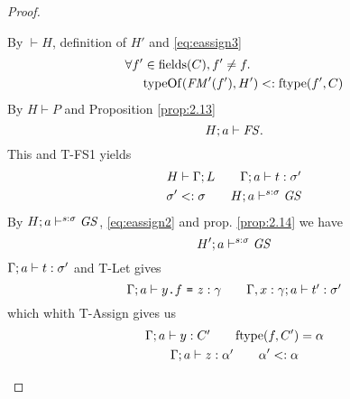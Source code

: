\begin{proof}
\begin{description}
\begin{description}
\begin{description}
              \vspace{2em}
              By $\vdash H$, definition of $H'$ and \eqref{eq:eassign3}
              \begin{equation} \label{eq:eassign4}
                \begin{aligned}
                  \forall f' &\in \mbox{$\mathrm{fields}$}(C), f' \neq f. \\ 
                                 &\mbox{$\mathrm{typeOf}$}(\mathit{FM}'(f'), H') <: \mbox{$\mathrm{ftype}$}(f', C)
                \end{aligned}
              \end{equation}
              By $H \vdash P$ and Proposition \ref{prop:2.13}
              \begin{equation} \label{eq:eassign5}
                H;a \vdash \mathit{FS}.
              \end{equation}
              This and {\sc T-FS1} yields
              \begin{equation}\label{eq:eassign6}
                \begin{gathered}
                  H \vdash \Gamma; L \quad\quad \mbox{$\Gamma;a\vdash t:\sigma'$} \\
                  \sigma' <: \sigma \quad\quad H; a \vdash^{s: \sigma} \mathit{GS}
                \end{gathered}
              \end{equation}
              By $H;a \vdash^{s: \sigma} \mathit{GS}$, \eqref{eq:eassign2} and prop.
              \ref{prop:2.14} we have 
              \begin{equation} \label{eq:eassign7} 
                H'; a \vdash^{s: \sigma} \mathit{GS}
              \end{equation}
              $\mbox{$\Gamma;a\vdash t:\sigma'$}$ and {\sc T-Let} gives
              \begin{equation} \label{eq:eassign8}
                \mbox{$\Gamma;a\vdash\mbox{\mdseries$y$\texttt{.}$f$~\texttt{=}~$z$}:\gamma$} \quad\quad
                \mbox{$\Gamma, x: \gamma;a\vdash t':\sigma'$}
              \end{equation}
              which whith {\sc T-Assign} gives us
              \begin{equation} \label{eq:eassign9}
                \begin{gathered}
                  \mbox{$\Gamma;a\vdash y:C'$} \quad\quad \mbox{$\mathrm{ftype}$}(f, C') = \alpha \\
                  \mbox{$\Gamma;a\vdash z:\alpha'$} \quad\quad \alpha' <: \alpha
                \end{gathered}
              \end{equation}

\end{description}
\end{description}
\end{description}
\end{proof}
